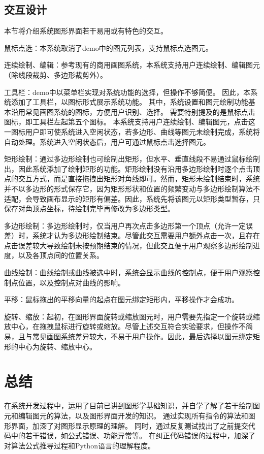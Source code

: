 \documentclass[a4paper,UTF8]{article}
\begin{document}
\subsection{交互设计}
本节将介绍系统图形界面若干易用或有特色的交互。

鼠标点选：本系统取消了demo中的图元列表，支持鼠标点选图元。

连续绘制、编辑：参考现有的商用画图系统，本系统支持用户连续绘制、编辑图元（除线段裁剪、多边形裁剪外）。

工具栏：demo中以菜单栏实现对系统功能的选择，但操作不够简便。
因此，本系统添加了工具栏，以图标形式展示系统功能。
其中，系统设置和图元绘制功能基本沿用常见画图系统的图标，方便用户识别、选择。
需要特别提及的是鼠标点击图标，即工具栏左起第五个图标。
本系统支持用户连续绘制、编辑图元，点击这一图标用户即可使系统进入空闲状态，若多边形、曲线等图元未绘制完成，系统将自动处理。系统进入空闲状态后，用户可通过鼠标点击选择图元。

矩形绘制：通过多边形绘制也可绘制出矩形，但水平、垂直线段不易通过鼠标绘制出，因此系统添加了绘制矩形的功能。矩形绘制没有沿用多边形绘制时逐个点击顶点的交互方式，而是直接拖拽出矩形对角线即可。然而，矩形未绘制结束时，系统并不以多边形的形式保存它，因为矩形形状和位置的频繁变动与多边形绘制算法不适配，会导致画布显示的矩形有偏差。因此，系统先将该图元以矩形类型暂存，只保存对角顶点坐标，待绘制完毕再修改为多边形类型。

多边形绘制：多边形绘制时，仅当用户再次点击多边形第一个顶点（允许一定误差）时，系统才认为多边形绘制结束。尽管此交互需要用户额外点击一次，且存在点击误差较大导致绘制未按预期结束的情况，但此交互便于用户观察多边形绘制进度，以及各顶点间的位置关系。

曲线绘制：曲线绘制或曲线被选中时，系统会显示曲线的控制点，便于用户观察控制点位置，以及控制点对曲线的影响。

平移：鼠标拖出的平移向量的起点在图元绑定矩形内，平移操作才会成功。

旋转、缩放：起初，在图形界面旋转或缩放图元时，用户需要先指定一个旋转或缩放中心，在拖拽鼠标进行旋转或缩放。尽管上述交互符合实验要求，但操作不简易，且与常见画图系统差异较大，不易于用户操作。因此，最后选择以图元绑定矩形的中心为旋转、缩放中心。



\section{总结}
在系统开发过程中，运用了目前已讲到图形学基础知识，并自学了解了若干绘制图元和编辑图元的算法，以及图形界面开发的知识。
通过实现所有指令的算法和图形界面，加深了对图形显示原理的理解。
同时，通过反复测试找出了之前提交代码中的若干错误，如公式错误、功能异常等。
在纠正代码错误的过程中，加深了对算法公式推导过程和Python语言的理解程度。
\end{document}

